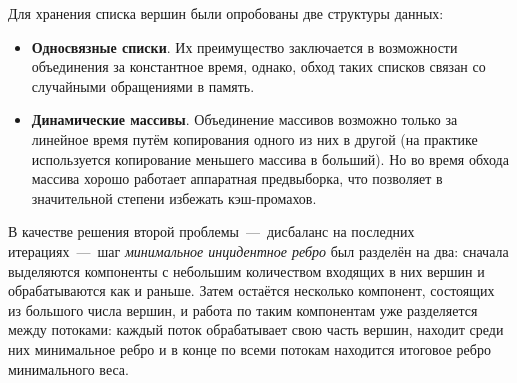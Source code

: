 \documentclass[a4paper,10pt]{extarticle}
\begin{document}
Для хранения списка вершин были опробованы две структуры данных:
\begin{itemize}
	\item \textbf{Односвязные списки}. Их преимущество заключается в возможности объединения за константное время, однако, обход таких списков связан со случайными обращениями в память.
	\item \textbf{Динамические массивы}. Объединение массивов возможно только за линейное время путём копирования одного из них в другой (на практике используется копирование меньшего массива в больший). Но во время обхода массива хорошо работает аппаратная предвыборка, что позволяет в значительной степени избежать кэш-промахов.
\end{itemize}

В качестве решения второй проблемы~---~дисбаланс на последних итерациях~---~шаг \textit{минимальное инцидентное ребро} был разделён на два: сначала выделяются компоненты с небольшим количеством входящих в них вершин и обрабатываются как и раньше. Затем остаётся несколько компонент, состоящих из большого числа вершин, и работа по таким компонентам уже разделяется между потоками: каждый поток обрабатывает свою часть вершин, находит среди них минимальное ребро и в конце по всеми потокам находится итоговое ребро минимального веса.

\end{document}
